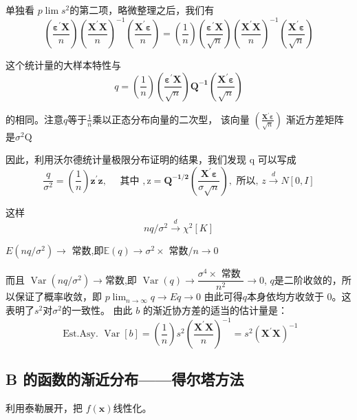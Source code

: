    单独看 $ p \lim s^{2} $的第二项，略微整理之后，我们有
   $$ \left(\frac{\boldsymbol{\varepsilon^{\prime} X}}{n}\right) \left(\frac{\boldsymbol{X^{\prime} X}}{n}\right)^{-1}
        \left(\frac{\boldsymbol{X^{\prime} \varepsilon}}{n}\right)=\left(\frac{1}{n}\right)\left(\frac{\boldsymbol{\varepsilon^{\prime} X}}{\sqrt{n}}\right)
        \left(\frac{\boldsymbol{X^{\prime} X}}{n}\right)^{-1}\left(\frac{\boldsymbol{X^{\prime} \varepsilon}}{\sqrt{n}}\right) $$

   这个统计量的大样本特性与
   $$ q = \left(\frac{1}{n}\right)\left(\frac{\boldsymbol{\varepsilon^{\prime} X}}{\sqrt{n}}\right) \boldsymbol{Q^{-1}}
        \left(\frac{\boldsymbol{X^{\prime} \varepsilon}}{\sqrt{n}}\right) $$

   的相同。注意$ q $等于$ \frac{1}{n} $乘以正态分布向量的二次型， 该向量 $ \left(\frac{\boldsymbol{X^{\prime} \varepsilon}}{\sqrt{n}}\right) $
   渐近方差矩阵是$ \sigma^{2} \boldsymbol{\mathrm{Q}} $

   因此，利用沃尔德统计量极限分布证明的结果，我们发现 q 可以写成 
   $$ \frac{q}{\sigma^{2}}=\left(\frac{1}{n}\right) \boldsymbol{z^{\prime} z}, \quad \text { 其中 }, 
        \mathrm{z}=\boldsymbol{Q^{-1 / 2}}\left(\frac{\boldsymbol{X^{\prime} \varepsilon}}{\sigma \sqrt{n}}\right),
         \text { 所以, } z \stackrel{d}{\longrightarrow} N[0, I] $$

   这样
   $$ n q / \sigma^{2} \stackrel{d}{\longrightarrow} \chi^{2}[K] $$

   $ E\left(n q / \sigma^{2}\right) \rightarrow $ 常数,即$ \mathbb{E}(q) \rightarrow \sigma^{2} \times$ 常数$ / n \rightarrow 0$

   而且 $ \operatorname{Var}\left(n q / \sigma^{2}\right) \rightarrow $常数,即
  $ \operatorname{Var}(q) \rightarrow \dfrac{\sigma^{4} \times \text { 常数 }}{n^{2}} \rightarrow 0 $,
 $ q $是二阶收敛的，所以保证了概率收敛，即 $ p \displaystyle \lim_{n \rightarrow \infty} q \rightarrow E q \rightarrow 0 $ 
 由此可得$ q $本身依均方收敛于 0。这表明了$ s^{ 2 }$对$ \sigma^{2} $的一致性。 由此 $ b $ 的渐近协方差的适当的估计量是：
 $$ \text { Est.Asy. } \operatorname{Var}[b]=\left(\frac{1}{n}\right) s^{2}\left(\frac{ \boldsymbol{X^{\prime} X} }{n}\right)^{-1}
        =s^{2}\left( \boldsymbol{X^{\prime} X} \right)^{-1} $$

 \subsection{B 的函数的渐近分布——得尔塔方法}

 利用泰勒展开，把 $f(\boldsymbol{x})$线性化。

